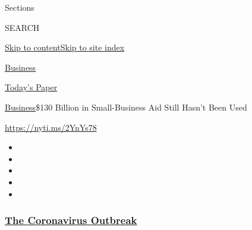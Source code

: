 Sections

SEARCH

\protect\hyperlink{site-content}{Skip to
content}\protect\hyperlink{site-index}{Skip to site index}

\href{https://www.nytimes3xbfgragh.onion/section/business}{Business}

\href{https://myaccount.nytimes3xbfgragh.onion/auth/login?response_type=cookie\&client_id=vi}{}

\href{https://www.nytimes3xbfgragh.onion/section/todayspaper}{Today's
Paper}

\href{/section/business}{Business}\textbar{}\$130 Billion in
Small-Business Aid Still Hasn't Been Used

\url{https://nyti.ms/2YnYs78}

\begin{itemize}
\item
\item
\item
\item
\item
\end{itemize}

\hypertarget{the-coronavirus-outbreak}{%
\subsubsection{\texorpdfstring{\href{https://www.nytimes3xbfgragh.onion/news-event/coronavirus?name=styln-coronavirus-markets\&region=TOP_BANNER\&variant=undefined\&block=storyline_menu_recirc\&action=click\&pgtype=Article\&impression_id=9f77a220-e383-11ea-a48e-b9252519409f}{The
Coronavirus
Outbreak}}{The Coronavirus Outbreak}}\label{the-coronavirus-outbreak}}

